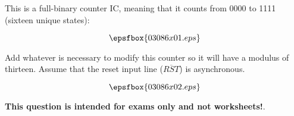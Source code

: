 

This is a full-binary counter IC, meaning that it counts from 0000 to 1111 (sixteen unique states):

$$\epsfbox{03086x01.eps}$$

\vskip 50pt

Add whatever is necessary to modify this counter so it will have a modulus of thirteen.  Assume that the reset input line ($\overline{RST}$) is asynchronous.







$$\epsfbox{03086x02.eps}$$







{\bf This question is intended for exams only and not worksheets!}.




